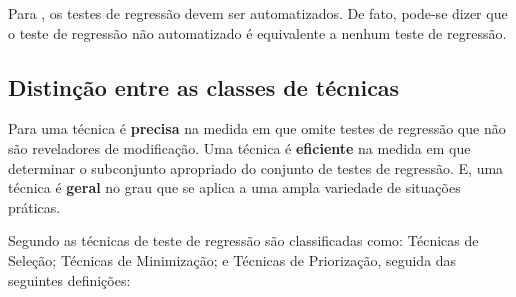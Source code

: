 Para , os testes de regressão devem ser automatizados. De fato, pode-se dizer que o teste de regressão não automatizado é equivalente a nenhum teste de regressão.


\subsection{Distinção entre as classes de técnicas}
 
Para  uma técnica é \textbf{precisa} na medida em que omite testes de regressão que não são reveladores de modificação. Uma técnica é \textbf{eficiente} na medida em que determinar o subconjunto apropriado do conjunto de testes de regressão. E, uma técnica é \textbf{geral} no grau que se aplica a uma ampla variedade de situações práticas.

Segundo  as técnicas de teste de regressão são classificadas como: Técnicas de Seleção; Técnicas de Minimização; e Técnicas de Priorização, seguida das seguintes definições:
 
